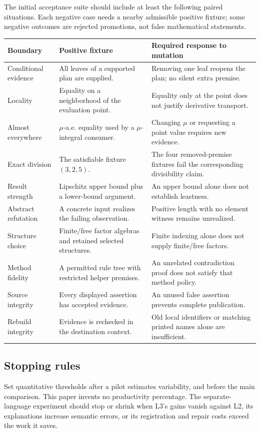 \documentclass[11pt,a4paper]{article}
\numberwithin{equation}{section}
\theoremstyle{definition}\newtheorem{definition}[theorem]{Definition}
\theoremstyle{remark}\newtheorem{remark}[theorem]{Remark}
\begin{document}
The initial acceptance suite should include at least the following paired
situations. Each negative case needs a nearby admissible positive fixture;
some negative outcomes are rejected promotions, not false mathematical
statements.
\begin{center}\small
\begin{longtable}{@{}P{35mm}P{59mm}P{49mm}@{}}\toprule
Boundary & Positive fixture & Required response to mutation\\\midrule\endhead
Conditional evidence & All leaves of a supported plan are supplied. & Removing one leaf reopens the plan; no silent extra premise.\\
Locality & Equality on a neighborhood of the evaluation point. & Equality only at the point does not justify derivative transport.\\
Almost everywhere & \(\mu\)-a.e. equality used by a \(\mu\)-integral consumer. & Changing \(\mu\) or requesting a point value requires new evidence.\\
Exact division & The satisfiable fixture \((3,2,5)\). & The four removed-premise fixtures fail the corresponding divisibility claim.\\
Result strength & Lipschitz upper bound plus a lower-bound argument. & An upper bound alone does not establish leastness.\\
Abstract refutation & A concrete input realizes the failing observation. & Positive length with no element witness remains unrealized.\\
Structure choice & Finite/free factor algebras and retained selected structures. & Finite indexing alone does not supply finite/free factors.\\
Method fidelity & A permitted rule tree with restricted helper premises. & An unrelated contradiction proof does not satisfy that method policy.\\
Source integrity & Every displayed assertion has accepted evidence. & An unused false assertion prevents complete publication.\\
Rebuild integrity & Evidence is rechecked in the destination context. & Old local identifiers or matching printed names alone are insufficient.\\\bottomrule
\end{longtable}
\end{center}

\subsection{Stopping rules}
Set quantitative thresholds after a pilot estimates variability, and before
the main comparison. This paper invents no productivity percentage. The
separate-language experiment should stop or shrink when L3's gains vanish
against L2, its explanations increase semantic errors, or its registration
and repair costs exceed the work it saves.
\end{document}
